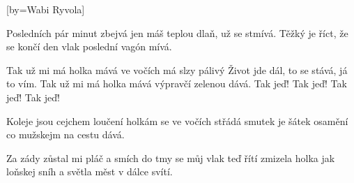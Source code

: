 [by={Wabi Ryvola}]

\beginverse{}
Posledních pár minut zbejvá jen
máš teplou dlaň, už se stmívá. 
Těžký je říct, že se končí den
vlak poslední vagón mívá. 
\endverse{}

\beginchorus{}
Tak už mi má holka mává
ve vočích má slzy pálivý
Život jde dál, to se stává, já to vím.
Tak už mi má holka mává
výpravčí zelenou dává.
Tak jeď! Tak jeď! Tak jeď! Tak jeď!
\endchorus{}

\beginverse{}
Koleje jsou cejchem loučení
holkám se ve vočích střádá
smutek je šátek osamění
co mužskejm na cestu dává. 
\endverse{}

\beginchorus{}
\phantom{}
\endchorus{}

\beginverse{}
Za zády zůstal mi pláč a smích
do tmy se můj vlak teď řítí
zmizela holka jak loňskej sníh
a světla měst v dálce svítí.
\endverse{}

\beginchorus{}
\phantom{}
\endchorus{}

\endsong{}
